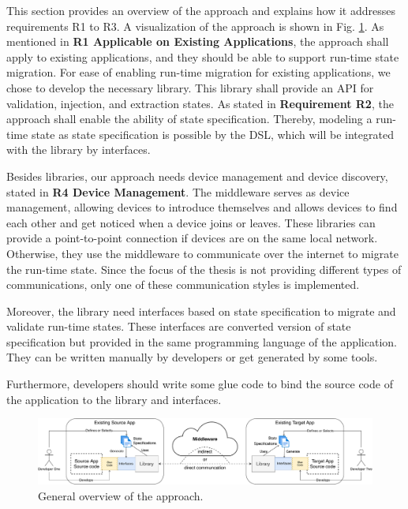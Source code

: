 This section provides an overview of the approach and explains how it addresses requirements R1 to R3.
A visualization of the approach is shown in Fig. \ref{fig:solution-overview}. As mentioned in \textbf{R1 Applicable on Existing Applications}, the approach shall apply to existing applications, and they should be able to support run-time state migration. For ease of enabling run-time migration for existing applications, we chose to develop the necessary library. This library shall provide an API for validation, injection, and extraction states. As stated in \textbf{Requirement R2}, the approach shall enable the ability of state specification. Thereby, modeling a run-time state as state specification is possible by the DSL, which will be integrated with the library by interfaces.

Besides libraries, our approach needs device management and device discovery, stated in \textbf{R4 Device Management}. The middleware serves as device management, allowing devices to introduce themselves and allows devices to find each other and get noticed when a device joins or leaves. These libraries can provide a point-to-point connection if devices are on the same local network. Otherwise, they use the middleware to communicate over the internet to migrate the run-time state. Since the focus of the thesis is not providing different types of communications, only one of these communication styles is implemented.

Moreover, the library need interfaces based on state specification to migrate and validate run-time states. These interfaces are converted version of state specification but provided in the same programming language of the application. They can be written manually by developers or get generated by some tools.

Furthermore, developers should write some glue code to bind the source code of the application to the library and interfaces.

\vspace{10mm}
\FloatBarrier
\begin{figure}[H]
    \includegraphics[width=\linewidth]{../figures/solution-overview.pdf}
    \centering
    \caption{General overview of the approach.}
    \label{fig:solution-overview}
\end{figure}
\FloatBarrier
